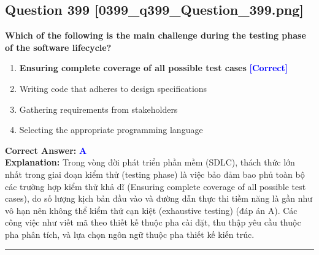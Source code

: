 \documentclass[11pt,a4paper]{article}
\begin{document}
\begin{minipage}{\textwidth}
\subsection*{Question 399 \quad \footnotesize{[0399\_q399\_Question\_399.png]}}
\noindent \textbf{Which of the following is the main challenge during the testing phase of the software lifecycle?}

\begin{enumerate}[label=\Alph*.]
    \item \textbf{Ensuring complete coverage of all possible test cases} \hfill \textcolor{blue}{\textbf{[Correct]}}
    \item Writing code that adheres to design specifications
    \item Gathering requirements from stakeholders
    \item Selecting the appropriate programming language
\end{enumerate}

\noindent \textbf{Correct Answer:} \textcolor{blue}{\textbf{A}} \\[2pt]
\noindent \textbf{Explanation:} Trong vòng đời phát triển phần mềm (SDLC), thách thức lớn nhất trong giai đoạn kiểm thử (testing phase) là việc bảo đảm bao phủ toàn bộ các trường hợp kiểm thử khả dĩ (Ensuring complete coverage of all possible test cases), do số lượng kịch bản đầu vào và đường dẫn thực thi tiềm năng là gần như vô hạn nên không thể kiểm thử cạn kiệt (exhaustive testing) (đáp án A). Các công việc như viết mã theo thiết kế thuộc pha cài đặt, thu thập yêu cầu thuộc pha phân tích, và lựa chọn ngôn ngữ thuộc pha thiết kế kiến trúc.

\par\vspace{0.3cm}
\hrule
\vspace{0.3cm}
\end{minipage}
\end{document}

